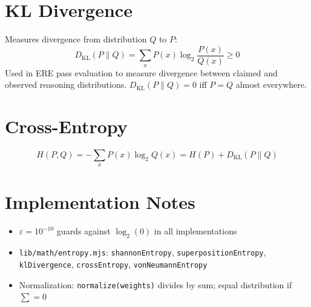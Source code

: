 \documentclass{article}
\begin{document}
\section{KL Divergence}
Measures divergence from distribution $Q$ to $P$:
\begin{equation}
  D_{\mathrm{KL}}(P \| Q) = \sum_x P(x) \log_2 \frac{P(x)}{Q(x)} \geq 0
\end{equation}
Used in ERE pass evaluation to measure divergence between claimed and observed reasoning distributions. $D_{\mathrm{KL}}(P \| Q) = 0$ iff $P = Q$ almost everywhere.

\section{Cross-Entropy}
\begin{equation}
  H(P, Q) = -\sum_x P(x) \log_2 Q(x) = H(P) + D_{\mathrm{KL}}(P \| Q)
\end{equation}

\section{Implementation Notes}
\begin{itemize}
  \item $\varepsilon = 10^{-10}$ guards against $\log_2(0)$ in all implementations
  \item \texttt{lib/math/entropy.mjs}: \texttt{shannonEntropy}, \texttt{superpositionEntropy}, \texttt{klDivergence}, \texttt{crossEntropy}, \texttt{vonNeumannEntropy}
  \item Normalization: \texttt{normalize(weights)} divides by sum; equal distribution if $\sum = 0$
\end{itemize}
\end{document}
